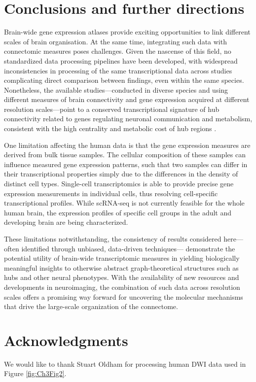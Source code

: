 \section{Conclusions and further directions}

Brain-wide gene expression atlases provide exciting opportunities to link different scales of brain organisation. At the same time, integrating such data with connectomic measures poses challenges. Given the nascense of this field, no standardized data processing pipelines have been developed, with widespread inconsistencies in processing of the same transcriptional data across studies \citep{Arnatkeviciute2019} complicating direct comparison between findings, even within the same species. Nonetheless, the available studies---conducted in diverse species and using different measures of brain connectivity and gene expression acquired at different resolution scales---point to a conserved transcriptional signature of hub connectivity related to genes regulating neuronal communication and metabolism, consistent with the high centrality and metabolic cost of hub regions \citep{Bullmore2009}.

One limitation affecting the human data is that the gene expression measures are derived from bulk tissue samples. The cellular composition of these samples can influence measured gene expression patterns, such that two samples can differ in their transcriptional properties simply due to the differences in the density of distinct cell types. Single-cell transcriptomics is able to provide precise gene expression measurements in individual cells, thus resolving cell-specific transcriptional profiles. While scRNA-seq is not currently feasible for the whole human brain, the expression profiles of specific cell groups in the adult \citep{Johnson2015a,Hu2017,Picardi2017} and developing brain \citep{Zhong2018} are being characterized.

These limitations notwithstanding, the consistency of results considered here---often identified through unbiased, data-driven techniques--- demonstrate the potential utility of brain-wide transcriptomic measures in yielding biologically meaningful insights to otherwise abstract graph-theoretical structures such as hubs and other neural phenotypes. With the availability of new resources and developments in neuroimaging, the combination of such data across resolution scales offers a promising way forward for uncovering the molecular mechanisms that drive the large-scale organization of the connectome.

\section*{Acknowledgments}

We would like to thank Stuart Oldham for processing human DWI data used in Figure \ref{fig:Ch3Fig2}.
